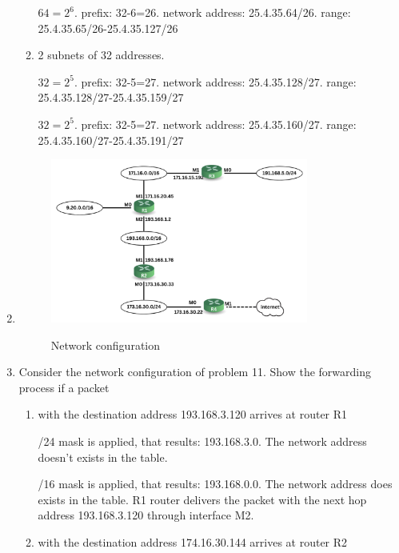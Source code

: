 \documentclass{article}
\begin{document}
\begin{enumerate}
\begin{enumerate}
    $64=2^{6}$. prefix: 32-6=26. network address: 25.4.35.64/26. range: 25.4.35.65/26-25.4.35.127/26

    \item 2 subnets of 32 addresses.

    $32=2^{5}$. prefix: 32-5=27. network address: 25.4.35.128/27. range: 25.4.35.128/27-25.4.35.159/27

    $32=2^{5}$. prefix: 32-5=27. network address: 25.4.35.160/27. range: 25.4.35.160/27-25.4.35.191/27

  \end{enumerate}
  
  \item
  
  \begin{figure}[H]
    \centering
    \includegraphics[width=0.8\textwidth]{question11.png}
    \begin{minipage}{0.8\textwidth}
        \centering
        Network configuration
    \end{minipage}
  \end{figure}

  \item Consider the network configuration of problem 11. Show the forwarding process if a packet
  \begin{enumerate}
    \item with the destination address 193.168.3.120 arrives at router R1

    /24 mask is applied, that results: 193.168.3.0. The network address doesn't exists in the table.

    /16 mask is applied, that results: 193.168.0.0. The network address does exists in the table.
    R1 router delivers the packet with the next hop address 193.168.3.120 through interface M2.

    \item with the destination address 174.16.30.144 arrives at router R2


\end{enumerate}
\end{enumerate}
\end{document}
